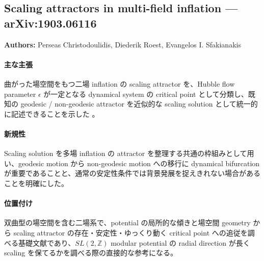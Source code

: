 \subsection{Scaling attractors in multi-field inflation --- arXiv:1903.06116}

\textbf{Authors:} Perseas Christodoulidis, Diederik Roest, Evangelos I. Sfakianakis

\paragraph{主な主張}
曲がった場空間をもつ二場 inflation の scaling attractor を、Hubble flow parameter \(\epsilon\) が一定となる dynamical system の critical point として分類し、既知の geodesic / non-geodesic attractor を近似的な scaling solution として統一的に記述できることを示した \cite{Christodoulidis:2019scaling}。

\paragraph{新規性}
Scaling solution を多場 inflation の attractor を整理する共通の枠組みとして用い、geodesic motion から non-geodesic motion への移行に dynamical bifurcation が重要であることと、通常の安定性条件では背景発展を捉えきれない場合があることを明確にした。

\paragraph{位置付け}
双曲型の場空間を含む二場系で、potential の局所的な傾きと場空間 geometry から scaling attractor の存在・安定性・ゆっくり動く critical point への追従を調べる基礎文献であり、\(SL(2,\mathbb{Z})\) modular potential の radial direction が長く scaling を保てるかを調べる際の直接的な参考になる。
